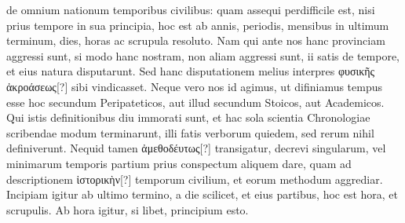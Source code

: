de omnium nationum temporibus civilibus: quam assequi perdifficile
est, nisi prius tempore in sua principia, hoc est ab annis, periodis,
mensibus in ultimum terminum, dies, horas ac scrupula resoluto.
Nam qui ante nos hanc provinciam aggressi sunt, si modo hanc nostram,
non aliam aggressi sunt, ii satis de tempore, et eius natura
disputarunt.
Sed hanc disputationem melius interpres
 \textgreek{φυσικῆς ἀκροάσεως[?]}
sibi vindicasset.
Neque vero nos id agimus, ut difiniamus
tempus esse hoc secundum Peripateticos, aut illud secundum Stoicos,
aut Academicos.
Qui istis definitionibus diu immorati sunt, et hac
sola scientia Chronologiae scribendae modum terminarunt, illi fatis
verborum quiedem, sed rerum nihil definiverunt.
%
Nequid tamen
\textgreek{ἀμεθοδέυτως[?]} transigatur, decrevi singularum, vel
 minimarum temporis
partium prius conspectum aliquem dare, quam ad descriptionem
\textgreek{ἱστορικὴν[?]} temporum civilium, et eorum methodum aggrediar.
Incipiam igitur ab ultimo termino, a die scilicet, et eius partibus,
hoc est hora, et scrupulis.
Ab hora igitur, si libet, principium esto.
